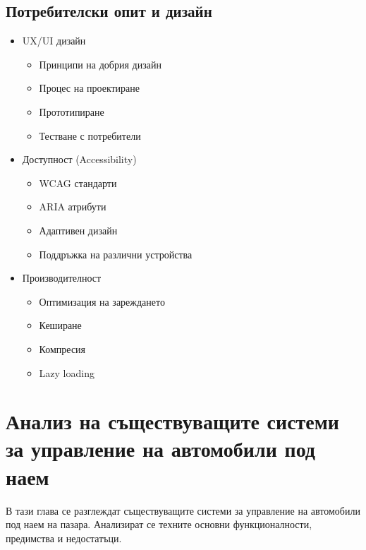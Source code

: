 \documentclass[12pt,a4paper]{article}
\begin{document}
\subsection{Потребителски опит и дизайн}
\begin{itemize}
    \item UX/UI дизайн
    \begin{itemize}
        \item Принципи на добрия дизайн
        \item Процес на проектиране
        \item Прототипиране
        \item Тестване с потребители
    \end{itemize}
    
    \item Доступност (Accessibility)
    \begin{itemize}
        \item WCAG стандарти
        \item ARIA атрибути
        \item Адаптивен дизайн
        \item Поддръжка на различни устройства
    \end{itemize}
    
    \item Производителност
    \begin{itemize}
        \item Оптимизация на зареждането
        \item Кеширане
        \item Компресия
        \item Lazy loading
    \end{itemize}
\end{itemize}

\section{Анализ на съществуващите системи за управление на автомобили под наем}
В тази глава се разглеждат съществуващите системи за управление на автомобили под наем на пазара. Анализират се техните основни функционалности, предимства и недостатъци.
\end{document}
